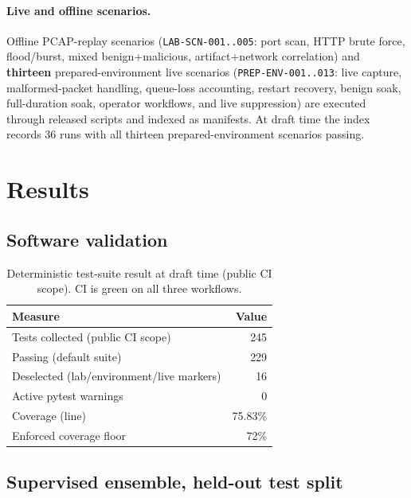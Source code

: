 \documentclass[11pt]{article}
\newcommand{\code}[1]{\texttt{#1}}
\begin{document}
\paragraph{Live and offline scenarios.} Offline PCAP-replay scenarios
(\code{LAB-SCN-001..005}: port scan, HTTP brute force, flood/burst, mixed
benign+malicious, artifact+network correlation) and \textbf{thirteen}
prepared-environment live scenarios (\code{PREP-ENV-001..013}: live capture,
malformed-packet handling, queue-loss accounting, restart recovery, benign soak,
full-duration soak, operator workflows, and live suppression) are executed
through released scripts and indexed as manifests. At draft time the index
records 36 runs with all thirteen prepared-environment scenarios passing.

\section{Results}
\label{sec:results}

\subsection{Software validation}

\begin{table}[h]
\centering
\begin{tabular}{lr}
\toprule
Measure & Value \\
\midrule
Tests collected (public CI scope) & 245 \\
Passing (default suite) & 229 \\
Deselected (lab/environment/live markers) & 16 \\
Active pytest warnings & 0 \\
Coverage (line) & 75.83\% \\
Enforced coverage floor & 72\% \\
\bottomrule
\end{tabular}
\caption{Deterministic test-suite result at draft time (public CI scope). CI is
green on all three workflows.}
\label{tab:tests}
\end{table}

\subsection{Supervised ensemble, held-out test split}
\end{document}
